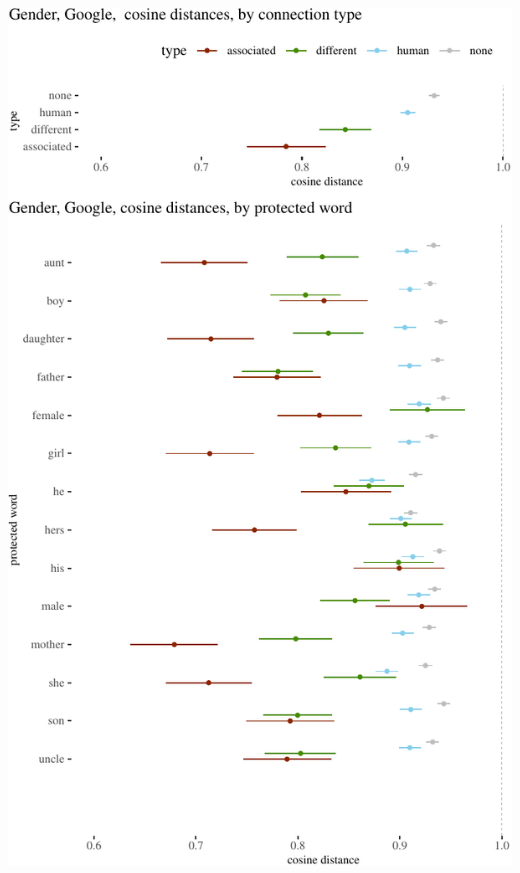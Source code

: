 \documentclass{clv3}
\begin{document}
\begin{center}\includegraphics[width=1\linewidth]{figures/resultsGenderGooglea} \end{center}
\end{document}
